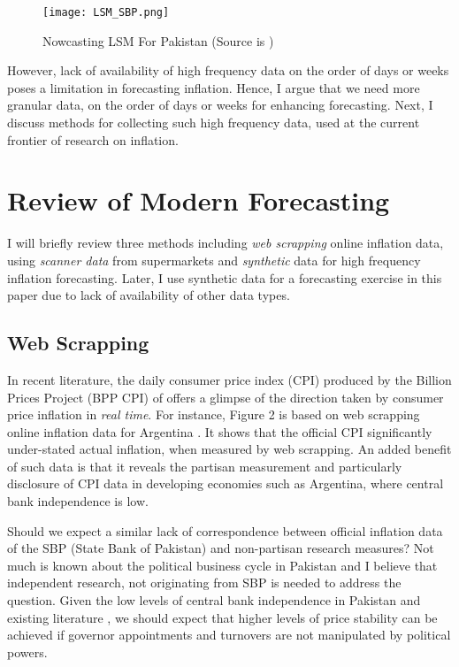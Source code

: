 \documentclass[12pt]{article}
\newcommand{\1}{\mathbbm 1}
\begin{document}
		
		\begin{figure}[H]
			\begin{Center}
				\texttt{[image: LSM\_SBP.png]}
				\caption{Nowcasting LSM For Pakistan (Source is \cite{hussain2018nowcasting})}
			\end{Center}
		\end{figure}
		
		
		However, lack of availability of high frequency data on the order of days or weeks poses a limitation in forecasting inflation. Hence, I argue that we need more granular data, on the order of days or weeks for enhancing forecasting. Next, I discuss methods for collecting such high frequency data, used at the current frontier of research on inflation.
		
		
		
		
		
		
		
		
		\section{Review of Modern Forecasting}
		
		I will briefly review three methods including \textit{web scrapping} online inflation data, using \textit{scanner data} from supermarkets and \textit{synthetic} data for high frequency inflation forecasting. Later, I use synthetic data for a forecasting exercise in this paper due to lack of availability of other data types.
		
		\subsection{Web Scrapping}
		
		
		In recent literature, the daily consumer price index (CPI) produced by the Billion Prices Project (BPP CPI) of \cite{cavallo2016billion} offers a glimpse of the direction taken by consumer price inflation in \textit{real time}. For instance, Figure 2 is based on web scrapping online inflation data for Argentina \cite{cavallo2016billion}. It shows that the official CPI significantly under-stated actual inflation, when measured by web scrapping. An added benefit of such data is that it reveals the partisan measurement and particularly disclosure of CPI data in developing economies such as Argentina, where central bank independence is low. 
		
		Should we expect a similar lack of correspondence between official inflation data of the SBP (State Bank of Pakistan) and non-partisan research measures? Not much is known about the political business cycle in Pakistan and I believe that independent research, not originating from SBP is needed to address the question. Given the low levels of central bank independence in Pakistan and existing literature \cite{vuletin2011replacing}, we should expect that higher levels of price stability can be achieved if governor appointments and turnovers are not manipulated by political powers. 
		
\end{document}
